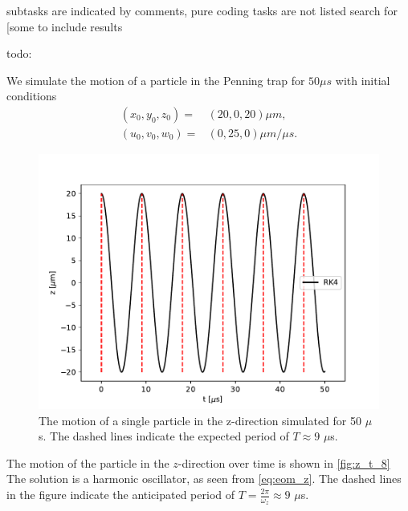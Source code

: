 subtasks are indicated by comments,
pure coding tasks are not listed
search for [some to include results


todo:


We simulate the motion of a particle in the Penning trap for $50 \mu s$ with initial conditions
\begin{align}
  (x_0, y_0, z_0) =& (20, 0, 20)\mu m, \\
  (u_0, v_0, w_0) =& (0, 25, 0) \mu m / \mu s.
\end{align}


\begin{figure}
\centering
\includegraphics[scale = 1]{../figures/z_t_.pdf}
\caption{The motion of a single particle in the z-direction simulated for 50 $\mu$s. The dashed lines indicate the expected period of $T \approx 9$ $\mu$s.}
\label{fig:z_t_8}
\end{figure}

The motion of the particle in the $z$-direction over time is shown in \autoref{fig:z_t_8}
The solution is a harmonic oscillator, as seen from \autoref{eq:eom_z}. The dashed lines in the figure indicate the anticipated period of $T = \frac{2\pi}{\omega_z} \approx 9$ $\mu$s.

